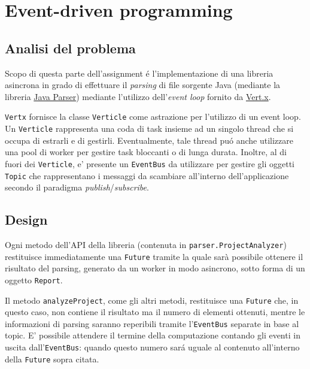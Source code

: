 \documentclass[report]{subfiles}
\begin{document}
	\section{Event-driven programming}
	\subsection{Analisi del problema}
	Scopo di questa parte dell'assignment \'e l'implementazione di una libreria asincrona in grado di effettuare il \emph{parsing} di file sorgente Java (mediante la libreria \href{https://javaparser.org/}{Java Parser}) mediante l'utilizzo dell'\emph{event loop} fornito da \href{https://vertx.io/}{Vert.x}.
	
	\texttt{Vertx} fornisce la classe \texttt{Verticle} come astrazione per l'utilizzo di un event loop. Un \texttt{Verticle} rappresenta una coda di task insieme ad un singolo thread che si occupa di estrarli e di gestirli. Eventualmente, tale thread pu\'o anche utilizzare una pool di worker per gestire task bloccanti o di lunga durata. Inoltre, al di fuori dei \texttt{Verticle}, e' presente un \texttt{EventBus} da utilizzare per gestire gli oggetti \texttt{Topic} che rappresentano i messaggi da scambiare all'interno dell'applicazione secondo il paradigma \emph{publish}/\emph{subscribe}.
	
	\subsection{Design}
	Ogni metodo dell'API della libreria (contenuta in \texttt{parser.ProjectAnalyzer}) restituisce immediatamente una \texttt{Future} tramite la quale sarà possibile ottenere il risultato del parsing, generato da un worker in modo asincrono, sotto forma di un oggetto \texttt{Report}.
	
	Il metodo \texttt{analyzeProject}, come gli altri metodi, restituisce una \texttt{Future} che, in questo caso, non contiene il risultato ma il numero di elementi ottenuti, mentre le informazioni di parsing saranno reperibili tramite l'\texttt{EventBus} separate in base al topic. E' possibile attendere il termine della computazione contando gli eventi in uscita dall'\texttt{EventBus}: quando questo numero sar\'a uguale al contenuto all'interno della \texttt{Future} sopra citata.
	
\end{document}
